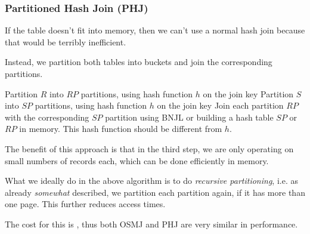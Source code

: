 \subsubsection{Partitioned Hash Join (PHJ)}
If the table doesn't fit into memory, then we can't use a normal hash join because that would be terribly inefficient.

Instead, we partition both tables into buckets and join the corresponding partitions.

\begin{algorithm}
    \caption{Partitioned Hash Join}
    \begin{algorithmic}[1]
            \State Partition $R$ into $RP$ partitions, using hash function $h$ on the join key
            \State Partition $S$ into $SP$ partitions, using hash function $h$ on the join key
            \State Join each partition $RP$ with the corresponding $SP$ partition using BNJL or building a hash table $SP$ or $RP$ in memory.
            This hash function should be different from $h$.
        \EndProcedure
    \end{algorithmic}
\end{algorithm}

The benefit of this approach is that in the third step, we are only operating on small numbers of records each, which can be done efficiently in memory.

What we ideally do in the above algorithm is to do \textit{recursive partitioning}, i.e. as already \textit{somewhat} described, we partition each partition again,
if it has more than one page. This further reduces access times.

The cost for this is , thus both OSMJ and PHJ are very similar in performance.
